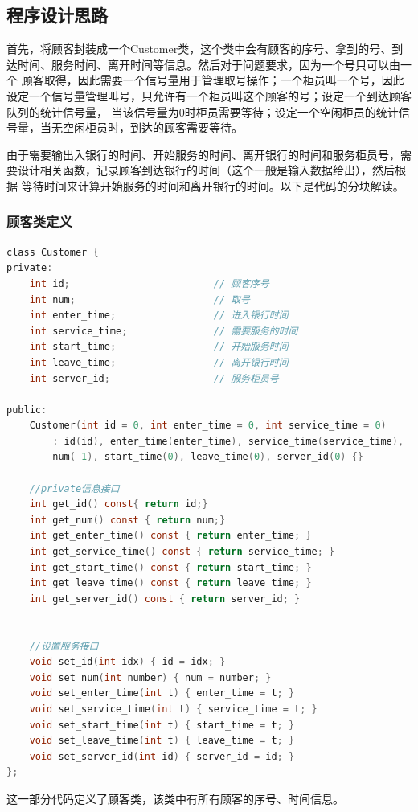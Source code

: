 \documentclass[UTF8]{ctexart}
\begin{document}
\subsection{程序设计思路}
首先，将顾客封装成一个Customer类，这个类中会有顾客的序号、拿到的号、到达时间、服务时间、离开时间等信息。然后对于问题要求，因为一个号只可以由一个
顾客取得，因此需要一个信号量用于管理取号操作；一个柜员叫一个号，因此设定一个信号量管理叫号，只允许有一个柜员叫这个顾客的号；设定一个到达顾客队列的统计信号量，
当该信号量为0时柜员需要等待；设定一个空闲柜员的统计信号量，当无空闲柜员时，到达的顾客需要等待。

由于需要输出入银行的时间、开始服务的时间、离开银行的时间和服务柜员号，需要设计相关函数，记录顾客到达银行的时间（这个一般是输入数据给出），然后根据
等待时间来计算开始服务的时间和离开银行的时间。以下是代码的分块解读。

\subsubsection{顾客类定义}
\begin{lstlisting}[frame=shadowbox, language=C]
class Customer {
private:
	int id;							// 顾客序号
	int num;						// 取号
	int enter_time;					// 进入银行时间
	int service_time;				// 需要服务的时间
	int start_time;					// 开始服务时间
	int leave_time;					// 离开银行时间
	int server_id;					// 服务柜员号

public:
	Customer(int id = 0, int enter_time = 0, int service_time = 0)
		: id(id), enter_time(enter_time), service_time(service_time),
		num(-1), start_time(0), leave_time(0), server_id(0) {}

	//private信息接口
	int	get_id() const{	return id;}
	int get_num() const { return num;}
	int get_enter_time() const { return enter_time; }
	int get_service_time() const { return service_time; }
	int get_start_time() const { return start_time; }
	int get_leave_time() const { return leave_time; }
	int get_server_id() const { return server_id; }


	//设置服务接口
	void set_id(int idx) { id = idx; }
	void set_num(int number) { num = number; }
	void set_enter_time(int t) { enter_time = t; }
	void set_service_time(int t) { service_time = t; }
	void set_start_time(int t) { start_time = t; }
	void set_leave_time(int t) { leave_time = t; }
	void set_server_id(int id) { server_id = id; }
};
\end{lstlisting}

这一部分代码定义了顾客类，该类中有所有顾客的序号、时间信息。
\end{document}
